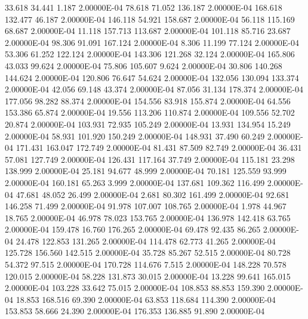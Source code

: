     33.618    34.441     1.187  2.00000E-04
    78.618    71.052   136.187  2.00000E-04
   168.618   132.477    46.187  2.00000E-04
   146.118    54.921   158.687  2.00000E-04
    56.118   115.169    68.687  2.00000E-04
    11.118   157.713   113.687  2.00000E-04
   101.118    85.716    23.687  2.00000E-04
    98.306    91.091   167.124  2.00000E-04
     8.306    11.199    77.124  2.00000E-04
    53.306    61.252   122.124  2.00000E-04
   143.306   121.268    32.124  2.00000E-04
   165.806    43.033    99.624  2.00000E-04
    75.806   105.607     9.624  2.00000E-04
    30.806   140.268   144.624  2.00000E-04
   120.806    76.647    54.624  2.00000E-04
   132.056   130.094   133.374  2.00000E-04
    42.056    69.148    43.374  2.00000E-04
    87.056    31.134   178.374  2.00000E-04
   177.056    98.282    88.374  2.00000E-04
   154.556    83.918   155.874  2.00000E-04
    64.556   153.386    65.874  2.00000E-04
    19.556   113.206   110.874  2.00000E-04
   109.556    52.702    20.874  2.00000E-04
   103.931    72.935   105.249  2.00000E-04
    13.931   134.954    15.249  2.00000E-04
    58.931   101.920   150.249  2.00000E-04
   148.931    37.490    60.249  2.00000E-04
   171.431   163.047   172.749  2.00000E-04
    81.431    87.509    82.749  2.00000E-04
    36.431    57.081   127.749  2.00000E-04
   126.431   117.164    37.749  2.00000E-04
   115.181    23.298   138.999  2.00000E-04
    25.181    94.677    48.999  2.00000E-04
    70.181   125.559    93.999  2.00000E-04
   160.181    65.263     3.999  2.00000E-04
   137.681   109.362   116.499  2.00000E-04
    47.681    48.052    26.499  2.00000E-04
     2.681    80.302   161.499  2.00000E-04
    92.681   146.258    71.499  2.00000E-04
    91.978   107.007   108.765  2.00000E-04
     1.978    44.967    18.765  2.00000E-04
    46.978    78.023   153.765  2.00000E-04
   136.978   142.418    63.765  2.00000E-04
   159.478    16.760   176.265  2.00000E-04
    69.478    92.435    86.265  2.00000E-04
    24.478   122.853   131.265  2.00000E-04
   114.478    62.773    41.265  2.00000E-04
   125.728   156.560   142.515  2.00000E-04
    35.728    85.267    52.515  2.00000E-04
    80.728    54.372    97.515  2.00000E-04
   170.728   114.676     7.515  2.00000E-04
   148.228    70.578   120.015  2.00000E-04
    58.228   131.873    30.015  2.00000E-04
    13.228    99.641   165.015  2.00000E-04
   103.228    33.642    75.015  2.00000E-04
   108.853    88.853   159.390  2.00000E-04
    18.853   168.516    69.390  2.00000E-04
    63.853   118.684   114.390  2.00000E-04
   153.853    58.666    24.390  2.00000E-04
   176.353   136.885    91.890  2.00000E-04
